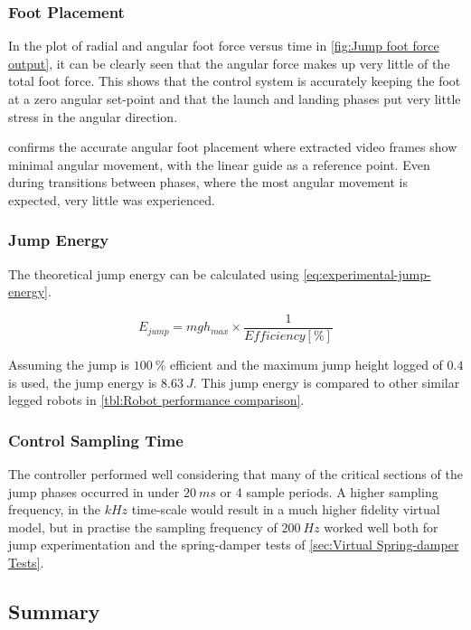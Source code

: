 \subsubsection{Foot Placement}

In the plot of radial and angular foot force versus time in \cref{fig:Jump foot force output}, it can be clearly seen that the angular force makes up very little of the total foot force. This shows that the control system is accurately keeping the foot at a zero angular set-point and that the launch and landing phases put very little stress in the angular direction. 

 confirms the accurate angular foot placement where extracted video frames show minimal angular movement, with the linear guide as a reference point. Even during transitions between phases, where the most angular movement is expected, very little was experienced.

\subsubsection{Jump Energy}

The theoretical jump energy can be calculated using \cref{eq:experimental-jump-energy}. 

\begin{equation} \label{eq:experimental-jump-energy}
E_{jump} = mgh_{max}\times \frac{1}{Efficiency[\%]}
\end{equation}

Assuming the jump is $100\ \%$ efficient and the maximum jump height logged of $0.4$ is used, the jump energy is $8.63\ J$. This jump energy is compared to other similar legged robots in \cref{tbl:Robot performance comparison}.

\subsubsection{Control Sampling Time}

The controller performed well considering that many of the critical sections of the jump phases occurred in under $20\ ms$ or 4 sample periods. A higher sampling frequency, in the $kHz$ time-scale would result in a much higher fidelity virtual model, but in practise the sampling frequency of $200\ Hz$ worked well both for jump experimentation and the spring-damper tests of \cref{sec:Virtual Spring-damper Tests}.

\subsection{Summary}

